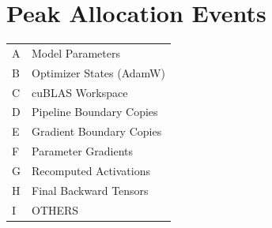 \documentclass{article}
\begin{document}
\section*{Peak Allocation Events}
\small
\begin{tabular}{ll}
A & Model Parameters \\
B & Optimizer States (AdamW) \\
C & cuBLAS Workspace \\
D & Pipeline Boundary Copies \\
E & Gradient Boundary Copies \\
F & Parameter Gradients \\
G & Recomputed Activations \\
H & Final Backward Tensors \\
I & OTHERS \\
\end{tabular}
\vspace{0.5em}
\end{document}
